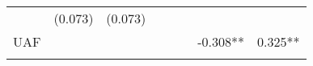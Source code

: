 \documentclass[12pt,twoside]{reedthesis}
\begin{document}
\begin{longtable}[]{@{}lccccccc@{}}
\begin{minipage}[t]{0.10\columnwidth}
  \strut
  \end{minipage} & \begin{minipage}[t]{0.10\columnwidth}\centering\strut
  (0.073)\strut
  \end{minipage} & \begin{minipage}[t]{0.10\columnwidth}\centering\strut
  (0.073)\strut
  \end{minipage}\tabularnewline
  \begin{minipage}[t]{0.12\columnwidth}\raggedright\strut
  UAF\strut
  \end{minipage} & \begin{minipage}[t]{0.09\columnwidth}\centering\strut
  \strut
  \end{minipage} & \begin{minipage}[t]{0.10\columnwidth}\centering\strut
  \strut
  \end{minipage} & \begin{minipage}[t]{0.10\columnwidth}\centering\strut
  \strut
  \end{minipage} & \begin{minipage}[t]{0.10\columnwidth}\centering\strut
  \strut
  \end{minipage} & \begin{minipage}[t]{0.10\columnwidth}\centering\strut
  \strut
  \end{minipage} & \begin{minipage}[t]{0.10\columnwidth}\centering\strut
  -0.308**\strut
  \end{minipage} & \begin{minipage}[t]{0.10\columnwidth}\centering\strut
  0.325**\strut
  \end{minipage}\tabularnewline
  \begin{minipage}[t]{0.12\columnwidth}\raggedright\strut
  \strut
  \end{minipage} & \begin{minipage}[t]{0.09\columnwidth}\centering\strut
  \strut
  \end{minipage} & \begin{minipage}[t]{0.10\columnwidth}\centering\strut
  \strut
  \end{minipage} & \begin{minipage}[t]{0.10\columnwidth}\centering\strut
  \strut
  \end{minipage} & \begin{minipage}[t]{0.10\columnwidth}\centering\strut
  \strut
  \end{minipage} & \begin{minipage}[t]{0.10\columnwidth}\centering\strut

\end{minipage}
\end{longtable}
\end{document}
